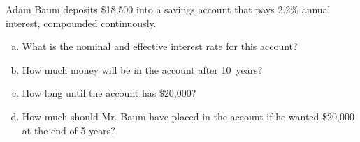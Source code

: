 \documentclass[11pt,letterpaper]{article}
\begin{document}
\newpage





 Adam Baum deposits \$18,500 into a savings account that pays 2.2\% annual interest, compounded continuously. 
\begin{enumerate}[(a)]
\item What is the nominal and effective interest rate for this account?
\item How much money will be in the account after 10~years?
\item How long until the account has \$20,000? 
\item How much should Mr. Baum have placed in the account if he wanted \$20,000 at the end of 5 years? 
\end{enumerate}
\end{document}
